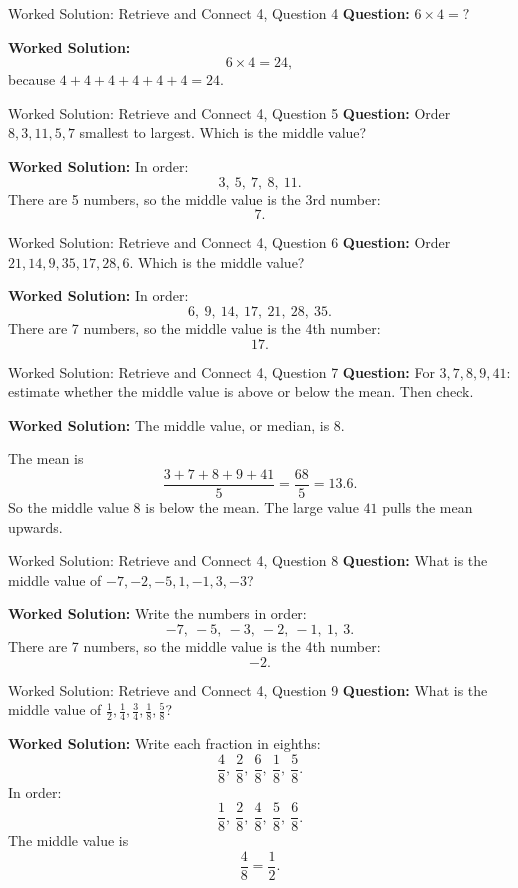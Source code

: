 \documentclass{beamer}
\begin{document}
\begin{frame}{Worked Solution: Retrieve and Connect 4, Question 4}
\textbf{Question:} \(6 \times 4 = ?\)

\textbf{Worked Solution:}
\[
6 \times 4 = 24,
\]
because \(4 + 4 + 4 + 4 + 4 + 4 = 24\).
\end{frame}

\begin{frame}{Worked Solution: Retrieve and Connect 4, Question 5}
\textbf{Question:} Order \(8, 3, 11, 5, 7\) smallest to largest. Which is the middle value?

\textbf{Worked Solution:}
In order:
\[
3,\ 5,\ 7,\ 8,\ 11.
\]
There are 5 numbers, so the middle value is the 3rd number:
\[
7.
\]
\end{frame}

\begin{frame}{Worked Solution: Retrieve and Connect 4, Question 6}
\textbf{Question:} Order \(21, 14, 9, 35, 17, 28, 6\). Which is the middle value?

\textbf{Worked Solution:}
In order:
\[
6,\ 9,\ 14,\ 17,\ 21,\ 28,\ 35.
\]
There are 7 numbers, so the middle value is the 4th number:
\[
17.
\]
\end{frame}

\begin{frame}{Worked Solution: Retrieve and Connect 4, Question 7}
\textbf{Question:} For \(3, 7, 8, 9, 41\): estimate whether the middle value is above or below the mean. Then check.

\textbf{Worked Solution:}
The middle value, or median, is \(8\).

The mean is
\[
\frac{3 + 7 + 8 + 9 + 41}{5}
= \frac{68}{5}
= 13.6.
\]
So the middle value \(8\) is below the mean. The large value \(41\) pulls the mean upwards.
\end{frame}

\begin{frame}{Worked Solution: Retrieve and Connect 4, Question 8}
\textbf{Question:} What is the middle value of \(-7, -2, -5, 1, -1, 3, -3\)?

\textbf{Worked Solution:}
Write the numbers in order:
\[
-7,\ -5,\ -3,\ -2,\ -1,\ 1,\ 3.
\]
There are 7 numbers, so the middle value is the 4th number:
\[
-2.
\]
\end{frame}

\begin{frame}{Worked Solution: Retrieve and Connect 4, Question 9}
\textbf{Question:} What is the middle value of \(\frac{1}{2}, \frac{1}{4}, \frac{3}{4}, \frac{1}{8}, \frac{5}{8}\)?

\textbf{Worked Solution:}
Write each fraction in eighths:
\[
\frac{4}{8},\ \frac{2}{8},\ \frac{6}{8},\ \frac{1}{8},\ \frac{5}{8}.
\]
In order:
\[
\frac{1}{8},\ \frac{2}{8},\ \frac{4}{8},\ \frac{5}{8},\ \frac{6}{8}.
\]
The middle value is
\[
\frac{4}{8} = \frac{1}{2}.
\]
\end{frame}
\end{document}
